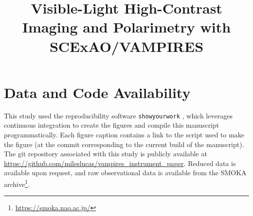 \documentclass[twocolumn]{aastex631}
\begin{document}
\title{Visible-Light High-Contrast Imaging and Polarimetry with SCExAO/VAMPIRES}






















\appendix






\section{Data and Code Availability}
This study used the reproducibility software \texttt{showyourwork} \citep{luger_mapping_2021}, which leverages continuous integration to create the figures and compile this manuscript programmatically. Each figure caption contains a link to the script used to make the figure (at the commit corresponding to the current build of the manuscript). The git repository associated with this study is publicly available at \url{https://github.com/mileslucas/vampires_instrument_paper}. Reduced data is available upon request, and raw observational data is available from the SMOKA archive\footnote{\url{https://smoka.nao.ac.jp/}}.
\end{document}
